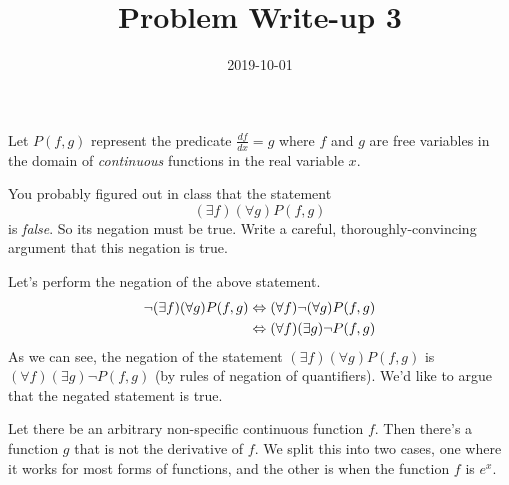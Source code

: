 \documentclass[a4paper,12pt]{article}
\title{Problem Write-up 3}
\date{2019-10-01}
\begin{document}
    \begin{problem}
        Let \(P(f,g)\) represent the predicate \(\frac{df}{dx} = g\) where \(f\) and \(g\) are free variables in the domain of \emph{continuous} functions in the real variable \(x\).

        You probably figured out in class that the statement \[(\exists f)(\forall g) P(f,g)\] is \emph{false}. So its negation must be true. Write a careful, thoroughly-convincing argument that this negation is true.

    \end{problem}
    \begin{answer}
        Let's perform the negation of the above statement.
        \begin{align*}
            \neg (\exists f)(\forall g) P(f,g) &\Leftrightarrow (\forall f) \neg (\forall g) P(f,g) \\
            &\Leftrightarrow (\forall f) (\exists g) \neg P(f,g)
        \end{align*}
        As we can see, the negation of the statement \((\exists f)(\forall g) P(f,g)\) is \((\forall f) (\exists g) \neg P(f,g)\) (by rules of negation of quantifiers). We'd like to argue that the negated statement is true.

        Let there be an arbitrary non-specific continuous function \(f\). Then there's a function \(g\) that is not the derivative of \(f\). We split this into two cases, one where it works for most forms of functions, and the other is when the function \(f\) is \(e^x\).

        
    \end{answer}
\end{document}

